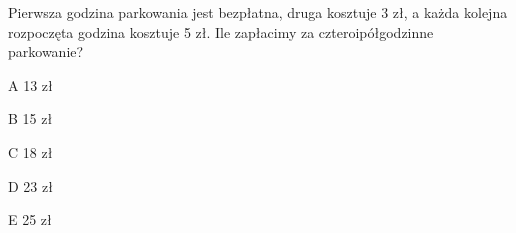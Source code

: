 \begin{tresc}
Pierwsza godzina parkowania jest bezpłatna, druga kosztuje 3 zł, a każda kolejna rozpoczęta godzina kosztuje 5 zł. Ile zapłacimy za czteroipółgodzinne parkowanie?
\end{tresc}
\begin{wariant}{A} 13 zł \end{wariant}
\begin{wariant}{B} 15 zł \end{wariant}
\begin{wariant}{C} 18 zł \end{wariant}
\begin{wariant}{D} 23 zł \end{wariant}
\begin{wariant}{E} 25 zł \end{wariant}
